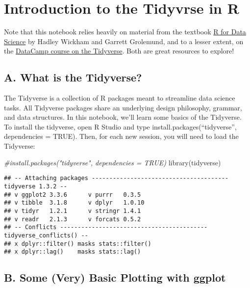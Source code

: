 \documentclass[
]{article}
\author{}
\date{\vspace{-2.5em}}
\newenvironment{Shaded}{\begin{snugshade}}{\end{snugshade}}
\newcommand{\CommentTok}[1]{\textcolor[rgb]{0.56,0.35,0.01}{\textit{#1}}}
\newcommand{\FunctionTok}[1]{\textcolor[rgb]{0.00,0.00,0.00}{#1}}
\newcommand{\NormalTok}[1]{#1}
\begin{document}
\hypertarget{introduction-to-the-tidyvrse-in-r}{%
\section{Introduction to the Tidyvrse in
R}\label{introduction-to-the-tidyvrse-in-r}}

Note that this notebook relies heavily on material from the textbook
\href{https://r4ds.had.co.nz/index.html}{R for Data Science} by Hadley
Wickham and Garrett Grolemund, and to a lesser extent, on the
\href{https://www.datacamp.com/courses/introduction-to-the-tidyverse}{DataCamp
course on the Tidyverse}. Both are great resources to explore!

\hypertarget{a.-what-is-the-tidyverse}{%
\subsection{A. What is the Tidyverse?}\label{a.-what-is-the-tidyverse}}

The Tidyverse is a collection of R packages meant to streamline data
science tasks. All Tidyverse packages share an underlying design
philosophy, grammar, and data structures. In this notebook, we'll learn
some basics of the Tidyverse. To install the tidyverse, open R Studio
and type install.packages(``tidyverse'', dependencies = TRUE). Then, for
each new session, you will need to load the Tidyverse:

\begin{Shaded}
\begin{Highlighting}[]
\CommentTok{\#install.packages("tidyverse", dependencies = TRUE)}
\FunctionTok{library}\NormalTok{(tidyverse)}
\end{Highlighting}
\end{Shaded}

\begin{verbatim}
## -- Attaching packages --------------------------------------- tidyverse 1.3.2 --
## v ggplot2 3.3.6      v purrr   0.3.5 
## v tibble  3.1.8      v dplyr   1.0.10
## v tidyr   1.2.1      v stringr 1.4.1 
## v readr   2.1.3      v forcats 0.5.2 
## -- Conflicts ------------------------------------------ tidyverse_conflicts() --
## x dplyr::filter() masks stats::filter()
## x dplyr::lag()    masks stats::lag()
\end{verbatim}

\hypertarget{b.-some-very-basic-plotting-with-ggplot}{%
\subsection{B. Some (Very) Basic Plotting with
ggplot}\label{b.-some-very-basic-plotting-with-ggplot}}
\end{document}
